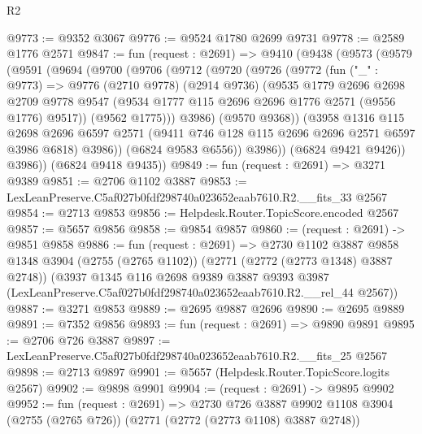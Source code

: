\begin{lexlean}{R2}
\begin{coremodule}
@9773 := @9352 @3067
@9776 := @9524 @1780 @2699 @9731
@9778 := @2589 @1776 @2571
@9847 := fun (request : @2691) =>
  @9410
    (@9438
      (@9573
        (@9579
          (@9591
            (@9694
              (@9700
                (@9706
                  (@9712
                    (@9720
                      (@9726
                        (@9772
                          (fun ("_" : @9773) =>
                          @9776
                            (@2710 @9778)
                            (@2914 @9736)
                            (@9535
                              @1779
                              @2696
                              @2698
                              @2709
                              @9778
                              @9547
                              (@9534 @1777 @115 @2696 @2696 @1776 @2571 (@9556 @1776) @9517))
                            (@9562 @1775)))
                        @3986)
                      (@9570 @9368))
                    (@3958
                      @1316
                      @115
                      @2698
                      @2696
                      @6597
                      @2571
                      (@9411 @746 @128 @115 @2696 @2696 @2571 @6597 @3986 @6818)
                      @3986))
                  (@6824 @9583 @6556))
                @3986))
            (@6824 @9421 @9426))
          @3986))
      (@6824 @9418 @9435))
@9849 := fun (request : @2691) => @3271 @9389
@9851 := @2706 @1102 @3887
@9853 := LexLeanPreserve.C5af027b0fdf298740a023652eaab7610.R2.__fits_33 @2567
@9854 := @2713 @9853
@9856 := Helpdesk.Router.TopicScore.encoded @2567
@9857 := @5657 @9856
@9858 := @9854 @9857
@9860 := (request : @2691) -> @9851 @9858
@9886 := fun (request : @2691) =>
  @2730
    @1102
    @3887
    @9858
    @1348
    @3904
    (@2755 (@2765 @1102))
    (@2771 (@2772 (@2773 @1348) @3887 @2748))
    (@3937
      @1345
      @116
      @2698
      @9389
      @3887
      @9393
      @3987
      (LexLeanPreserve.C5af027b0fdf298740a023652eaab7610.R2.__rel_44 @2567))
@9887 := @3271 @9853
@9889 := @2695 @9887 @2696
@9890 := @2695 @9889
@9891 := @7352 @9856
@9893 := fun (request : @2691) => @9890 @9891
@9895 := @2706 @726 @3887
@9897 := LexLeanPreserve.C5af027b0fdf298740a023652eaab7610.R2.__fits_25 @2567
@9898 := @2713 @9897
@9901 := @5657 (Helpdesk.Router.TopicScore.logits @2567)
@9902 := @9898 @9901
@9904 := (request : @2691) -> @9895 @9902
@9952 := fun (request : @2691) =>
  @2730
    @726
    @3887
    @9902
    @1108
    @3904
    (@2755 (@2765 @726))
    (@2771 (@2772 (@2773 @1108) @3887 @2748))

\end{coremodule}
\end{lexlean}
